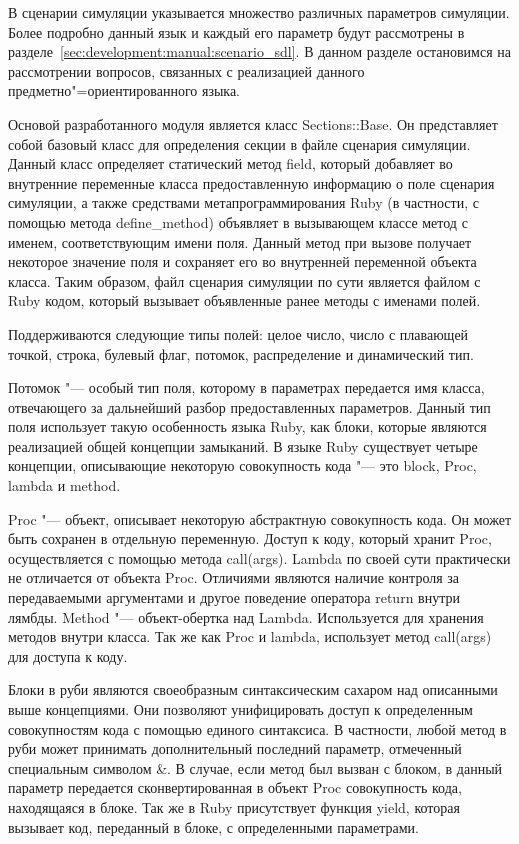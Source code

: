 В сценарии симуляции указывается множество различных параметров симуляции.
Более подробно данный язык и каждый его параметр будут рассмотрены в разделе~\ref{sec:development:manual:scenario_sdl}.
В данном разделе остановимся на рассмотрении вопросов, связанных с реализацией данного предметно"=ориентированного языка.

Основой разработанного модуля является класс Sections::Base. Он представляет собой базовый класс для определения секции в файле сценария симуляции.
Данный класс определяет статический метод field, который добавляет во внутренние переменные класса предоставленную информацию о поле сценария симуляции,
а также средствами метапрограммирования Ruby (в частности, с помощью метода define\_method) объявляет в вызывающем классе метод с именем, соответствующим имени поля.
Данный метод при вызове получает некоторое значение поля и сохраняет его во внутренней переменной объекта класса.
Таким образом, файл сценария симуляции по сути является файлом с Ruby кодом, который вызывает объявленные ранее методы с именами полей.

Поддерживаются следующие типы полей: целое число, число с плавающей точкой, строка, булевый флаг, потомок, распределение и динамический тип.

Потомок "--- особый тип поля, которому в параметрах передается имя класса, отвечающего за дальнейший разбор предоставленных параметров.
Данный тип поля использует такую особенность языка Ruby, как блоки, которые являются реализацией общей концепции замыканий.
В языке Ruby существует четыре концепции, описывающие некоторую совокупность кода "--- это block, Proc, lambda и method.

Proc "--- объект, описывает некоторую абстрактную совокупность кода. Он может быть сохранен в отдельную переменную. Доступ к коду, который хранит Proc, осуществляется с помощью метода call(args).
Lambda по своей сути практически не отличается от объекта Proc. Отличиями являются наличие контроля за передаваемыми аргументами и другое поведение оператора return внутри лямбды.
Method "--- объект-обертка над Lambda. Используется для хранения методов внутри класса. Так же как Proc и lambda, использует метод call(args) для доступа к коду.

Блоки в руби являются своеобразным синтаксическим сахаром над описанными выше концепциями.
Они позволяют унифицировать доступ к определенным совокупностям кода с помощью единого синтаксиса.
В частности, любой метод в руби может принимать дополнительный последний параметр, отмеченный специальным символом \&.
В случае, если метод был вызван с блоком, в данный параметр передается сконвертированная в объект Proc совокупность кода, находящаяся в блоке.
Так же в Ruby присутствует функция yield, которая вызывает код, переданный в блоке, с определенными параметрами.

